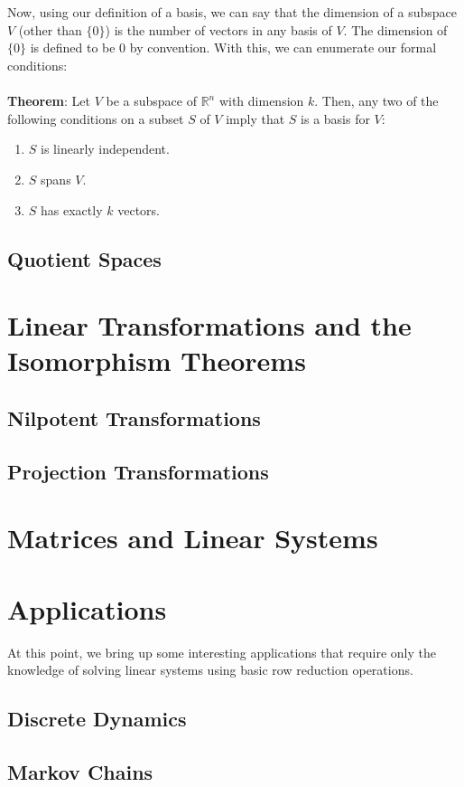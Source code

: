 \documentclass[11pt]{report}
\newcommand{\R}{\mathbb{R}}
\begin{document}
\\ \\
Now, using our definition of a basis, we can say that the dimension of a subspace $V$ (other than $\{0\}$) is the number of vectors in any basis of $V$. The dimension of $\{0\}$ is defined to be 0 by convention. With this, we can enumerate our formal conditions:
\\ \\
\textbf{Theorem}: Let $V$ be a subspace of $\R^n$ with dimension $k$. Then, any two of the following conditions on a subset $S$ of $V$ imply that $S$ is a basis for $V$:
\begin{enumerate}
\item $S$ is linearly independent.
\item $S$ spans $V$.
\item $S$ has exactly $k$ vectors.
\end{enumerate}
\section{Quotient Spaces}


\chapter{Linear Transformations and the Isomorphism Theorems}
\section{Nilpotent Transformations}
\section{Projection Transformations}
\chapter{Matrices and Linear Systems}


\chapter{Applications}
At this point, we bring up some interesting applications that require only the knowledge of solving linear systems using basic row reduction operations.
\section{Discrete Dynamics}
\section{Markov Chains}
\end{document}

